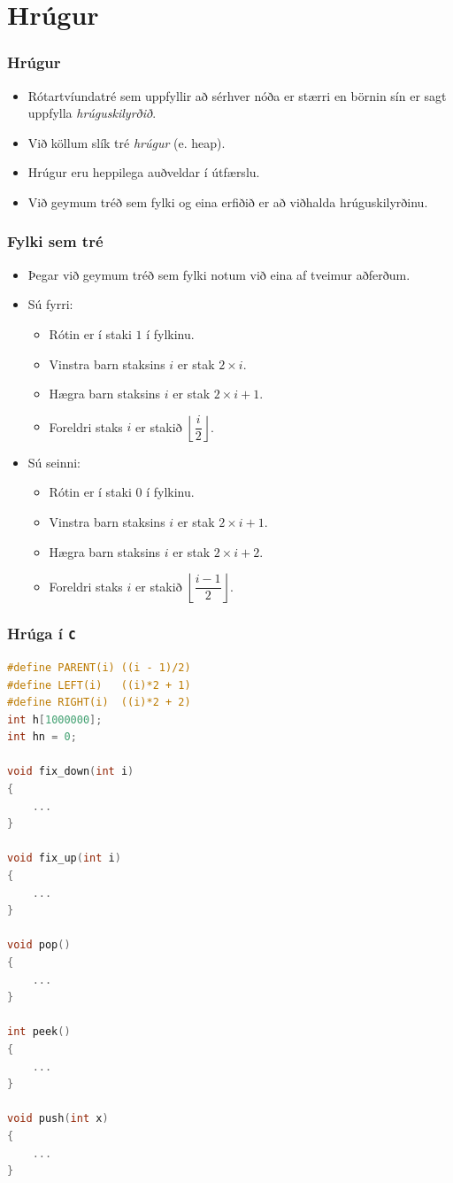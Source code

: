 \documentclass{beamer}
\begin{document}
\section[Hrúgur]{Hrúgur}

\begin{frame}
\frametitle{Hrúgur}
\begin{itemize}
	\item<1-> Rótartvíundatré sem uppfyllir að sérhver nóða er stærri en börnin sín er sagt uppfylla \emph{hrúguskilyrðið}.
	\item<2-> Við köllum slík tré \emph{hrúgur} (e. heap).
	\item<3-> Hrúgur eru heppilega auðveldar í útfærslu.
	\item<4-> Við geymum tréð sem fylki og eina erfiðið er að viðhalda hrúguskilyrðinu.
\end{itemize}
\end{frame}

\begin{frame}
\frametitle{Fylki sem tré}
\begin{itemize}
\item<1-> Þegar við geymum tréð sem fylki notum við eina af tveimur aðferðum.
\item<2-> Sú fyrri:
	\begin{itemize}
		\item<3-> Rótin er í staki $1$ í fylkinu.
		\item<4-> Vinstra barn staksins $i$ er stak $2\times i$.
		\item<5-> Hægra barn staksins $i$ er stak $2\times i + 1$.
		\item<6-> Foreldri staks $i$ er stakið $\left \lfloor \dfrac{i}{2} \right \rfloor$.
	\end{itemize}
\item<7-> Sú seinni:
	\begin{itemize}
		\item<8-> Rótin er í staki $0$ í fylkinu.
		\item<9-> Vinstra barn staksins $i$ er stak $2\times i + 1$.
		\item<10-> Hægra barn staksins $i$ er stak $2\times i + 2$.
		\item<11-> Foreldri staks $i$ er stakið $\left \lfloor \dfrac{i - 1}{2} \right \rfloor$.
	\end{itemize}
\end{itemize}
\end{frame}

\begin{frame}[fragile]
	\frametitle{Hrúga í \texttt{C}}
	\tiny
	\begin{lstlisting}[language=C]
#define PARENT(i) ((i - 1)/2)
#define LEFT(i)   ((i)*2 + 1)
#define RIGHT(i)  ((i)*2 + 2)
int h[1000000];
int hn = 0;

void fix_down(int i)
{
	...
}

void fix_up(int i)
{
	...
}

void pop()
{
	...
}

int peek()
{
	...
}

void push(int x)
{
	...
}
\end{lstlisting}
\end{frame}
\end{document}
